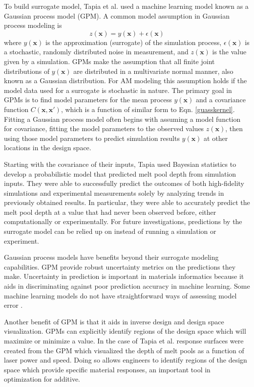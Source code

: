 To build surrogate model, Tapia et al. used a machine learning model known as a Gaussian process model (GPM). A common model assumption in Gaussian process modeling is
\begin{equation}
	z(\mathbf{x}) = y(\mathbf{x}) + \epsilon(\mathbf{x})
	\label{model}
\end{equation}
where $y(\mathbf{x})$ is the approximation (surrogate) of the simulation process, $\epsilon(\mathbf{x})$ is a stochastic, randomly distributed noise in measurement, and $z(\mathbf{x})$ is the value given by a simulation. GPMs make the assumption that all finite joint distributions of $y(\mathbf{x})$ are distributed in a multivariate normal manner, also known as a Gaussian distribution. For AM modeling this assumption holds if the model data used for a surrogate is stochastic in nature. The primary goal in GPMs is to find model parameters for the mean process $y(\mathbf{x})$ and a covariance function $C(\mathbf{x},\mathbf{x}')$, which is a function of similar form to Eqn. \ref{guasskernel}. Fitting a Gaussian process model often begins with assuming a model function for covariance, fitting the model parameters to the observed values $z(\mathbf{x})$, then using those model parameters to predict simulation results $y(\mathbf{x})$ at other locations in the design space. 

Starting with the covariance of their inputs, Tapia used Bayesian statistics to develop a probabilistic model that predicted melt pool depth from simulation inputs. They were able to successfully predict the outcomes of both high-fidelity simulations and experimental measurements solely by analyzing trends in previously obtained results. In particular, they were able to accurately predict the melt pool depth at a value that had never been observed before, either computationally or experimentally. For future investigations, predictions by the surrogate model can be relied up on instead of running a simulation or experiment. 

Gaussian process models have benefits beyond their surrogate modeling capabilities. GPM provide robust uncertainty metrics on the predictions they make. Uncertainty in prediction is important in materials informatics because it aids in discriminating against poor prediction accuracy in machine learning. Some machine learning models do not have straightforward ways of assessing model error \cite{Bessa2017}. 

Another benefit of GPM is that it aids in inverse design and design space visualization. GPMs can explicitly identify regions of the design space which will maximize or minimize a value. In the case of Tapia et al. response surfaces were created from the GPM which visualized the depth of melt pools as a function of laser power and speed. Doing so allows engineers to identify regions of the design space which provide specific material responses, an important tool in optimization for additive.


